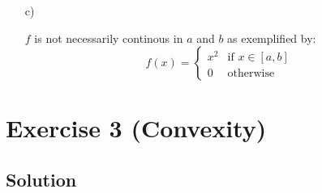 \documentclass[10pt]{article}
\numberwithin{equation}{section}
\begin{document}
\begin{enumerate}
{}
\item[c)]{
    $f$ is not necessarily continous in $a$ and $b$ as exemplified by:
    $$f(x) = 
    \begin{cases}
      x^2 & \text{if } x \in [a,b]\\
      0 & \text{otherwise}
    \end{cases}
    $$

  }

\end{enumerate}

\section*{Exercise 3 (Convexity)}
\subsection*{Solution}
\end{document}
